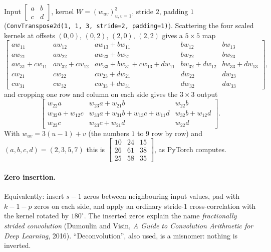 \begin{notechapter}
\begin{example}\label{fully-convolutional:ex:transposed}
Input $\begin{bmatrix}a&b\\c&d\end{bmatrix}$, kernel $W = (w_{uv})_{u,v=1}^3$, stride $2$, padding $1$
(\texttt{ConvTranspose2d(1, 1, 3, stride=2, padding=1)}). Scattering the four scaled kernels at
offsets $(0,0)$, $(0,2)$, $(2,0)$, $(2,2)$ gives a $5\times5$ map
\[
  \begin{bmatrix}
    aw_{11} & aw_{12} & aw_{13} + bw_{11} & bw_{12} & bw_{13}\\
    aw_{21} & aw_{22} & aw_{23} + bw_{21} & bw_{22} & bw_{23}\\
    aw_{31} + cw_{11} & aw_{32} + cw_{12} & aw_{33} + bw_{31} + cw_{13} + dw_{11} & bw_{32} + dw_{12} & bw_{33} + dw_{13}\\
    cw_{21} & cw_{22} & cw_{23} + dw_{21} & dw_{22} & dw_{23}\\
    cw_{31} & cw_{32} & cw_{33} + dw_{31} & dw_{32} & dw_{33}
  \end{bmatrix},
\]
and cropping one row and column on each side gives the $3\times3$ output
\[
  \begin{bmatrix}
    w_{22}a & w_{23}a + w_{21}b & w_{22}b\\
    w_{32}a + w_{12}c & w_{33}a + w_{31}b + w_{13}c + w_{11}d & w_{32}b + w_{12}d\\
    w_{22}c & w_{23}c + w_{21}d & w_{22}d
  \end{bmatrix}.
\]
With $w_{uv} = 3(u - 1) + v$ (the numbers $1$ to $9$ row by row) and $(a,b,c,d) = (2,3,5,7)$ this is
$\begin{bmatrix}10&24&15\\26&61&38\\25&58&35\end{bmatrix}$, as PyTorch computes.
\end{example}

\paragraph{Zero insertion.} Equivalently: insert $s - 1$ zeros between neighbouring input values,
pad with $k - 1 - p$ zeros on each side, and apply an ordinary stride-$1$ cross-correlation with the
kernel rotated by $180^\circ$. The inserted zeros explain the name \emph{fractionally strided convolution}
(Dumoulin and Visin, \emph{A Guide to Convolution Arithmetic for Deep Learning}, 2016).
``Deconvolution'', also used, is a misnomer: nothing is inverted.


\end{notechapter}
